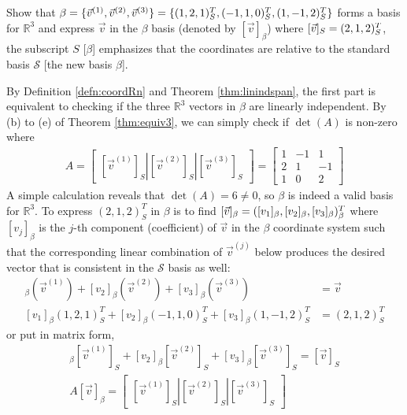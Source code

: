 \begin{exmp}
\label{exmp:basisR3}
Show that $\mathcal{\beta} = \{\vec{v}^{(1)}, \vec{v}^{(2)}, \vec{v}^{(3)}\} = \{\smash{(1,2,1)_S^T}, \smash{(-1,1,0)_S^T}, \allowbreak \smash{(1,-1,2)_S^T}\}$ forms a basis for $\mathbb{R}^3$ and express $\vec{v}$ in the $\mathcal{\beta}$ basis (denoted by $[\vec{v}]_\beta$) where $[\vec{v}]_S = \smash{(2,1,2)_S^T}$, the subscript $S$ [$\beta$] emphasizes that the coordinates are relative to the standard basis $\mathcal{S}$ [the new basis $\mathcal{\beta}$].
\end{exmp}
\begin{solution}
By Definition \ref{defn:coordRn} and Theorem \ref{thm:linindspan}, the first part is equivalent to checking if the three $\mathbb{R}^3$ vectors in $\mathcal{\beta}$ are linearly independent. By (b) to (e) of Theorem \ref{thm:equiv3}, we can simply check if $\det(A)$ is non-zero where 
\begin{align*}
A = \begin{bmatrix}[\vec{v}^{(1)}]_S|[\vec{v}^{(2)}]_S|[\vec{v}^{(3)}]_S
\end{bmatrix} =
\begin{bmatrix}
1 & -1 & 1 \\
2 & 1 & -1 \\
1 & 0 & 2
\end{bmatrix}
\end{align*}
A simple calculation reveals that $\det(A) = 6 \neq 0$, so $\mathcal{\beta}$ is indeed a valid basis for $\mathbb{R}^3$. To express $(2,1,2)_S^T$ in $\mathcal{\beta}$ is to find $[\vec{v}]_\beta = \smash{([v_1]_\beta, [v_2]_\beta, [v_3]_\beta)_\beta^T}$ where $[v_j]_\beta$ is the $j$-th component (coefficient) of $\vec{v}$ in the $\mathcal{\beta}$ coordinate system such that the corresponding linear combination of $\vec{v}^{(j)}$ below produces the desired vector that is consistent in the $\mathcal{S}$ basis as well:
\begin{align*}
[v_1]_\beta(\vec{v}^{(1)}) + [v_2]_\beta(\vec{v}^{(2)}) + [v_3]_\beta(\vec{v}^{(3)}) &= \vec{v} \\
[v_1]_\beta(1,2,1)_S^T + [v_2]_\beta(-1,1,0)_S^T + [v_3]_\beta(1,-1,2)_S^T &= (2,1,2)_S^T \end{align*}
or put in matrix form,
\begin{align*}
[v_1]_\beta[\vec{v}^{(1)}]_S + [v_2]_\beta[\vec{v}^{(2)}]_S + [v_3]_\beta[\vec{v}^{(3)}]_S = [\vec{v}]_S \\
A[\vec{v}]_\beta = \begin{bmatrix}[\vec{v}^{(1)}]_S|[\vec{v}^{(2)}]_S|[\vec{v}^{(3)}]_S

\end{bmatrix}
\end{align*}
\end{solution}
